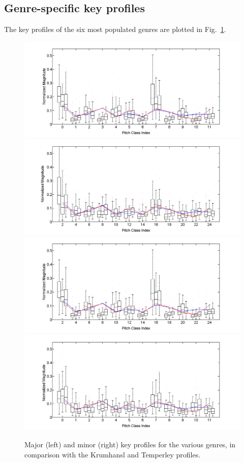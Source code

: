 \documentclass{article}
\begin{document}
\subsection{Genre-specific key profiles}
The key profiles of the six most populated genres are plotted in Fig.~\ref{fig:SpecificKeyProfiles}.
\begin{figure}[tb]
    \includegraphics[scale=.2]{graph/boxPlotsMajCPR+Krum+Temp}
    \includegraphics[scale=.2]{graph/boxPlotsMinBHP+Krum+Temp}
    \includegraphics[scale=.2]{graph/boxPlotsMajDJRk+Krum+Temp}
    \includegraphics[scale=.2]{graph/boxPlotsMinDMR+Krum+Temp}
	\caption{Major (left) and minor (right) key profiles for the various genres, in comparison with the Krumhansl and Temperley profiles.}
	\label{fig:SpecificKeyProfiles}
\end{figure}
\end{document}
